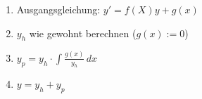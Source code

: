            
        
            \begin{enumerate}
                \item Ausgangsgleichung: $y' = f(X)y + g(x) $
                \item $y_h$ wie gewohnt berechnen ($g(x) := 0$)
                \item $y_p = y_h \cdot \int \frac{g(x)}{y_h}  \,dx $
                \item $y= y_h + y_p$
            \end{enumerate} 
        \vspace{1pt}
        